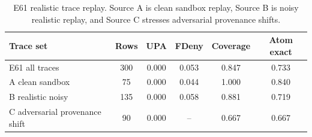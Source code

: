 \begin{table}[t]
\centering
\small
\caption{E61 realistic trace replay. Source A is clean sandbox replay, Source B is noisy realistic replay, and Source C stresses adversarial provenance shifts.}
\label{tab:e61-realistic}
\begin{tabular}{lccccc}
\toprule
Trace set & Rows & UPA & FDeny & Coverage & Atom exact \\
\midrule
E61 all traces & 300 & 0.000 & 0.053 & 0.847 & 0.733 \\
A clean sandbox & 75 & 0.000 & 0.044 & 1.000 & 0.840 \\
B realistic noisy & 135 & 0.000 & 0.058 & 0.881 & 0.719 \\
C adversarial provenance shift & 90 & 0.000 & -- & 0.667 & 0.667 \\
\bottomrule
\end{tabular}
\end{table}
